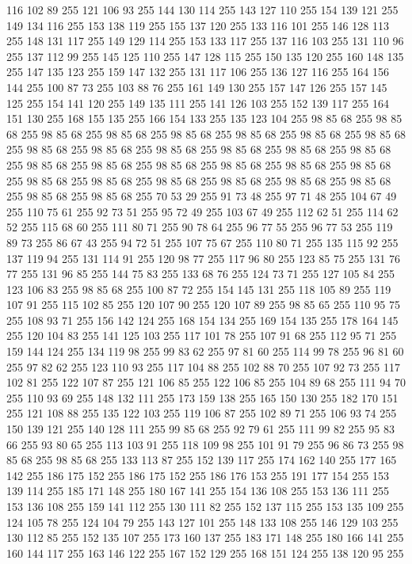 116 102 89 255 121 106 93 255 144 130 114 255 143 127 110 255 154 139 121 255 149 134 116 255 153 138 119 255 155 137 120 255 133 116 101 255 146 128 113 255 148 131 117 255 149 129 114 255 153 133 117 255 137 116 103 255 131 110 96 255 137 112 99 255 145 125 110 255 147 128 115 255 150 135 120 255 160 148 135 255 147 135 123 255 159 147 132 255 131 117 106 255 136 127 116 255 164 156 144 255 100 87 73 255 103 88 76 255 161 149 130 255 157 147 126 255 157 145 125 255 154 141 120 255 149 135 111 255 141 126 103 255 152 139 117 255 164 151 130 255 168 155 135 255 166 154 133 255 135 123 104 255 98 85 68 255 98 85 68 255 98 85 68 255 98 85 68 255 98 85 68 255 98 85 68 255 98 85 68 255 98 85 68 255 98 85 68 255 98 85 68 255 98 85 68 255 98 85 68 255 98 85 68 255 98 85 68 255 98 85 68 255 98 85 68 255 98 85 68 255 98 85 68 255 98 85 68 255 98 85 68 255 98 85 68 255 98 85 68 255 98 85 68 255 98 85 68 255 98 85 68 255 98 85 68 255
98 85 68 255 98 85 68 255 70 53 29 255 91 73 48 255 97 71 48 255 104 67 49 255 110 75 61 255 92 73 51 255 95 72 49 255 103 67 49 255 112 62 51 255 114 62 52 255 115 68 60 255 111 80 71 255 90 78 64 255 96 77 55 255 96 77 53 255 119 89 73 255 86 67 43 255 94 72 51 255 107 75 67 255 110 80 71 255 135 115 92 255 137 119 94 255 131 114 91 255 120 98 77 255 117 96 80 255 123 85 75 255 131 76 77 255 131 96 85 255 144 75 83 255 133 68 76 255 124 73 71 255 127 105 84 255 123 106 83 255 98 85 68 255 100 87 72 255 154 145 131 255 118 105 89 255 119 107 91 255 115 102 85 255 120 107 90 255 120 107 89 255 98 85 65 255 110 95 75 255 108 93 71 255 156 142 124 255 168 154 134 255 169 154 135 255 178 164 145 255 120 104 83 255 141 125 103 255 117 101 78 255 107 91 68 255 112 95 71 255 159 144 124 255 134 119 98 255 99 83 62 255 97 81 60 255 114 99 78 255 96 81 60 255 97 82 62 255 123 110 93 255 117 104 88 255
102 88 70 255 107 92 73 255 117 102 81 255 122 107 87 255 121 106 85 255 122 106 85 255 104 89 68 255 111 94 70 255 110 93 69 255 148 132 111 255 173 159 138 255 165 150 130 255 182 170 151 255 121 108 88 255 135 122 103 255 119 106 87 255 102 89 71 255 106 93 74 255 150 139 121 255 140 128 111 255 99 85 68 255 92 79 61 255 111 99 82 255 95 83 66 255 93 80 65 255 113 103 91 255 118 109 98 255 101 91 79 255 96 86 73 255 98 85 68 255 98 85 68 255 133 113 87 255 152 139 117 255 174 162 140 255 177 165 142 255 186 175 152 255 186 175 152 255 186 176 153 255 191 177 154 255 153 139 114 255 185 171 148 255 180 167 141 255 154 136 108 255 153 136 111 255 153 136 108 255 159 141 112 255 130 111 82 255 152 137 115 255 153 135 109 255 124 105 78 255 124 104 79 255 143 127 101 255 148 133 108 255 146 129 103 255 130 112 85 255 152 135 107 255 173 160 137 255 183 171 148 255 180 166 141 255 160 144 117 255 163 146 122 255 167 152 129 255 168 151 124 255 138 120 95 255
